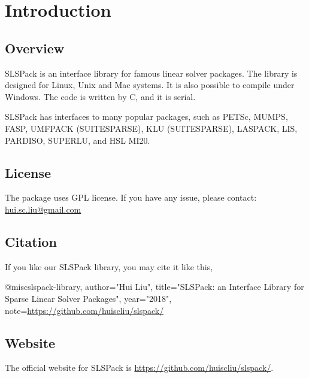 
\chapter{Introduction}

\section{Overview}

SLSPack is an interface library for famous linear solver packages. 
The library is designed for Linux, Unix and Mac systems. 
It is also possible to compile under Windows.  The code is written by C, and it is serial.

SLSPack has interfaces to many popular packages, 
such as PETSc, MUMPS, FASP, UMFPACK (SUITESPARSE), KLU (SUITESPARSE), LASPACK, 
LIS, PARDISO, SUPERLU, and HSL MI20.


\section{License}
The package uses GPL license. If you have any issue, 
please contact: \href{mailto: hui.sc.liu@gmail.com}{hui.sc.liu@gmail.com}


\section{Citation}
If you like our SLSPack library, you may cite it like this,
\begin{evb}
@misc{slspack-library,
    author="Hui Liu",
    title="SLSPack: an Interface Library for Sparse Linear Solver Packages",
    year="2018",
    note={\url{https://github.com/huiscliu/slspack/}}
}
\end{evb}


\section{Website}
The official website for SLSPack is \url{https://github.com/huiscliu/slspack/}.


